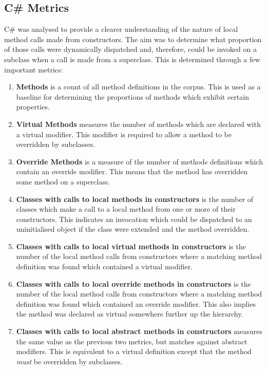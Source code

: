 \subsection{C\# Metrics}
C\# was analysed to provide a clearer understanding of the nature of local method calls made from constructors. The aim was to determine what proportion of those calls were dynamically dispatched and, therefore, could be invoked on a subclass when a call is made from a superclass. This is determined through a few important metrics:
\begin{enumerate}
	\item \textbf{Methods} is a count of all method definitions in the corpus. This is used as a baseline for determining the proportions of methods which exhibit certain properties.
	
	\item \textbf{Virtual Methods} measures the number of methods which are declared with a virtual modifier. This modifier is required to allow a method to be overridden by subclasses.
	
	\item \textbf{Override Methods} is a measure of the number of methods definitions which contain an override modifier. This means that the method has overridden some method on a superclass.
	
	\item \textbf{Classes with calls to local methods in constructors} is the number of classes which make a call to a local method from one or more of their constructors. This indicates an invocation which could be dispatched to an uninitialised object if the class were extended and the method overridden.
	
	\item \textbf{Classes with calls to local virtual methods in constructors} is the number of the local method calls from constructors where a matching method definition was found which contained a virtual modifier.
	
	\item \textbf{Classes with calls to local override methods in constructors} is the number of the local method calls from constructors where a matching method definition was found which contained an override modifier. This also implies the method was declared as virtual somewhere further up the hierarchy.
	
	\item \textbf{Classes with calls to local abstract methods in constructors} measures the same value as the previous two metrics, but matches against abstract modifiers. This is equivalent to a virtual definition except that the method \textit{must} be overridden by subclasses.
	

\end{enumerate}
